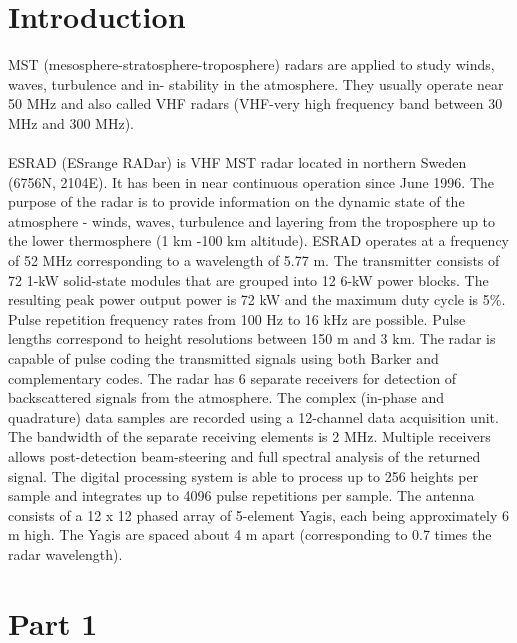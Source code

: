 \documentclass{article}
\begin{document}
\section{Introduction}
MST (mesosphere-stratosphere-troposphere) radars are applied to study winds, waves, turbulence and in- stability in the atmosphere. They usually operate near 50 MHz and also called VHF radars (VHF-very high frequency band between 30 MHz and 300 MHz).\\
\\
ESRAD (ESrange RADar) is VHF MST radar located in northern Sweden (6756N, 2104E). It has been in near continuous operation since June 1996. The purpose of the radar is to provide information on the dynamic state of the atmosphere - winds, waves, turbulence and layering from the troposphere up to the lower thermosphere (1 km -100 km altitude). ESRAD operates at a frequency of 52 MHz corresponding to a wavelength of 5.77 m. The transmitter consists of 72 1-kW solid-state modules that are grouped into 12 6-kW power blocks. The resulting peak power output power is 72 kW and the maximum duty cycle is 5\%. Pulse repetition frequency rates from 100 Hz to 16 kHz are possible. Pulse lengths correspond to height resolutions between 150 m and 3 km. The radar is capable of pulse coding the transmitted signals using both Barker and complementary codes. The radar has 6 separate receivers for detection of backscattered signals from the atmosphere. The complex (in-phase and quadrature) data samples are recorded using a 12-channel data acquisition unit. The bandwidth of the separate receiving elements is 2 MHz. Multiple receivers allows post-detection beam-steering and full spectral analysis of the returned signal. The digital processing system is able to process up to 256 heights per sample and integrates up to 4096 pulse repetitions per sample. The antenna consists of a 12 x 12 phased array of 5-element Yagis, each being approximately 6 m high. The Yagis are spaced about 4 m apart (corresponding to 0.7 times the radar wavelength). \cite{Enmark:2012a2}
 

\section{Part 1}
\label{sec:part1}
\end{document}
